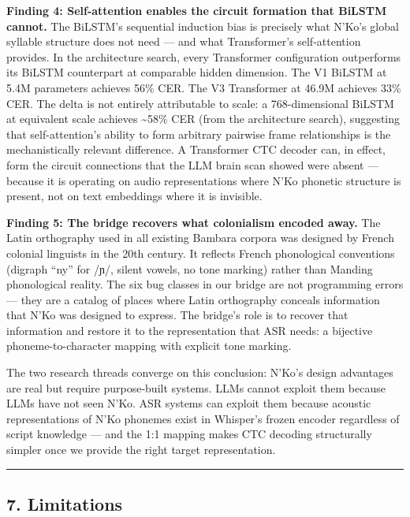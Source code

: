 \documentclass[
]{article}
\begin{document}
\textbf{Finding 4: Self-attention enables the circuit formation that
BiLSTM cannot.} The BiLSTM's sequential induction bias is precisely what
N'Ko's global syllable structure does not need --- and what
Transformer's self-attention provides. In the architecture search, every
Transformer configuration outperforms its BiLSTM counterpart at
comparable hidden dimension. The V1 BiLSTM at 5.4M parameters achieves
56\% CER. The V3 Transformer at 46.9M achieves 33\% CER. The delta is
not entirely attributable to scale: a 768-dimensional BiLSTM at
equivalent scale achieves \textasciitilde58\% CER (from the architecture
search), suggesting that self-attention's ability to form arbitrary
pairwise frame relationships is the mechanistically relevant difference.
A Transformer CTC decoder can, in effect, form the circuit connections
that the LLM brain scan showed were absent --- because it is operating
on audio representations where N'Ko phonetic structure is present, not
on text embeddings where it is invisible.

\textbf{Finding 5: The bridge recovers what colonialism encoded away.}
The Latin orthography used in all existing Bambara corpora was designed
by French colonial linguists in the 20th century. It reflects French
phonological conventions (digraph ``ny'' for /ɲ/, silent vowels, no tone
marking) rather than Manding phonological reality. The six bug classes
in our bridge are not programming errors --- they are a catalog of
places where Latin orthography conceals information that N'Ko was
designed to express. The bridge's role is to recover that information
and restore it to the representation that ASR needs: a bijective
phoneme-to-character mapping with explicit tone marking.

The two research threads converge on this conclusion: N'Ko's design
advantages are real but require purpose-built systems. LLMs cannot
exploit them because LLMs have not seen N'Ko. ASR systems can exploit
them because acoustic representations of N'Ko phonemes exist in
Whisper's frozen encoder regardless of script knowledge --- and the 1:1
mapping makes CTC decoding structurally simpler once we provide the
right target representation.

\begin{center}\rule{0.5\linewidth}{0.5pt}\end{center}

\subsection{7. Limitations}\label{limitations}
\end{document}
